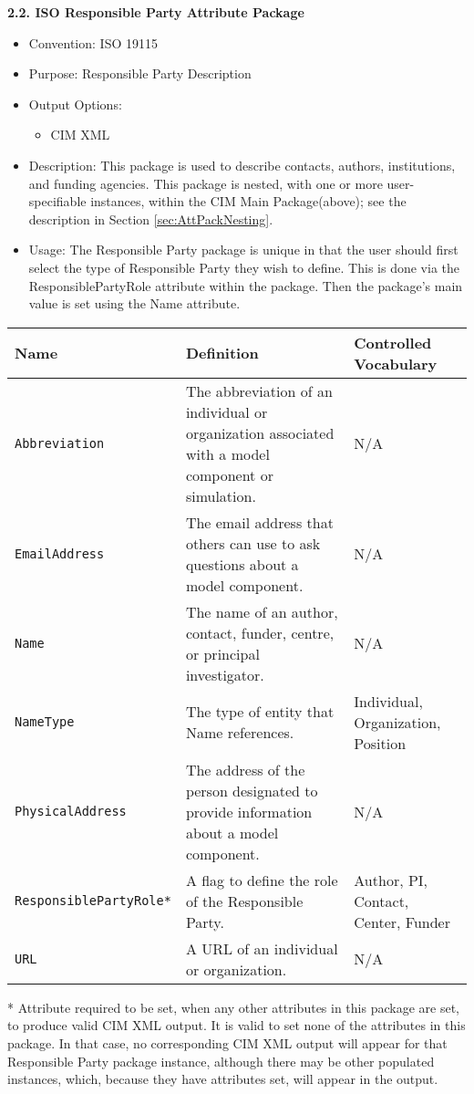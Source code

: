 \vspace{.20in}

{\bf 2.2. ISO Responsible Party Attribute Package}

\begin{itemize}
    \item Convention: ISO 19115
    \item Purpose: Responsible Party Description
    \item Output Options: 
    \begin{itemize}
        \item CIM XML 
    \end{itemize} 
    \item Description: This package is used to describe contacts, authors, institutions, and funding agencies. This package is nested, with one or more user-specifiable instances, within the CIM Main Package(above); see the description in Section \ref{sec:AttPackNesting}.
    \item Usage: The Responsible Party package is unique in that the user should first select the type of Responsible Party they wish to define. This is done via the ResponsiblePartyRole attribute within the package. Then the package's main value is set using the Name attribute.  
\end{itemize}


\begin{tabular}{|p{5cm}|p{5cm}|p{4cm}|}
     \hline\hline
     {\bf Name } & {\bf Definition} & {\bf Controlled Vocabulary} \\
     \hline\hline
     {\tt Abbreviation} & The abbreviation of an individual or organization associated with a model component or simulation. & N/A \\
     {\tt EmailAddress} & The email address that others can use to ask questions about a model component. & N/A \\
     {\tt Name} & The name of an author, contact, funder, centre, or principal investigator. & N/A \\
     {\tt NameType} & The type of entity that Name references. & Individual, Organization, Position \\
     {\tt PhysicalAddress} & The address of the person designated to provide information about a model component. & N/A \\
     {\tt ResponsiblePartyRole*} & A flag to define the role of the Responsible Party. & Author, PI, Contact, Center, Funder \\
     {\tt URL} & A URL of an individual or organization. & N/A \\
     \hline\hline
\end{tabular}
\linebreak
* Attribute required to be set, when any other attributes in this package are set, to produce valid CIM XML output. It is valid to set none of the attributes in this package. In that case, no corresponding CIM XML output will appear for that Responsible Party package instance, although there may be other populated instances, which, because they have attributes set, will appear in the output. \\


